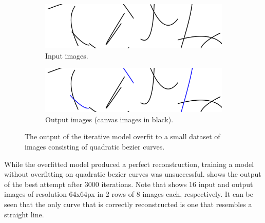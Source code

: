 \begin{figure}
    \centering
    \begin{subfigure}{.45\textwidth}
        \includegraphics[width=\textwidth]{graphics/work-artifacts/116/input.png}
        \caption{Input images.}
    \end{subfigure}
    \begin{subfigure}{.45\textwidth}
        \includegraphics[width=\textwidth]{graphics/work-artifacts/116/recons.png}
        \caption{Output images (canvas images in black).}
    \end{subfigure}
    \caption{The output of the iterative model overfit to a small dataset of images consisting of quadratic bezier curves.}
    \label{fig:iterative.116.recons}
\end{figure}

While the overfitted model produced a perfect reconstruction, training a model without overfitting on quadratic bezier curves was unsuccessful.  shows the output of the best attempt after \num{3000} iterations. Note that  shows 16 input and output images of resolution 64x64px in 2 rows of 8 images each, respectively. It can be seen that the only curve that is correctly reconstructed is one that resembles a straight line.

